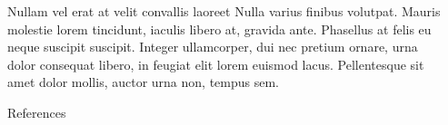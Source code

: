 \documentclass[final]{beamer}
\newlength{\sepwidth}
\newlength{\colwidth}
\newcommand{\separatorcolumn}{\begin{column}{\sepwidth}\end{column}}
\begin{document}
\begin{frame}[t]
\begin{columns}[t]
\begin{column}{\colwidth}
\begin{block}{Nullam vel erat at velit convallis laoreet}
    Nulla varius finibus volutpat. Mauris molestie lorem tincidunt, iaculis
    libero at, gravida ante. Phasellus at felis eu neque suscipit suscipit.
    Integer ullamcorper, dui nec pretium ornare, urna dolor consequat libero,
    in feugiat elit lorem euismod lacus. Pellentesque sit amet dolor mollis,
    auctor urna non, tempus sem.

  \end{block}

  \begin{block}{References}

    \nocite{*}
    \footnotesize{}

  \end{block}

\end{column}

\separatorcolumn
\end{columns}
\end{frame}
\end{document}
